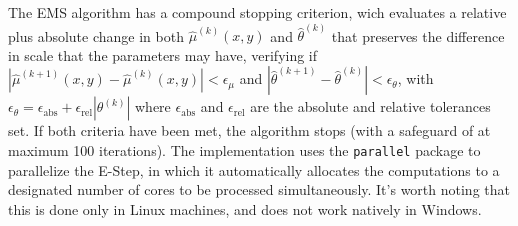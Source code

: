 The EMS algorithm has a compound stopping criterion, wich evaluates a relative plus absolute change in both $\hat{\mu}^{(k)}(x,y)$ and $\hat{\theta}^{(k)}$ that preserves the difference in scale that the parameters may have, verifying if $|\hat{\mu}^{(k+1)}(x,y) - \hat{\mu}^{(k)}(x,y)| < \epsilon_{\mu}$ and $|\hat{\theta}^{(k+1)} - \hat{\theta}^{(k)}| < \epsilon_{\theta}$, with $\epsilon_{\theta} = \epsilon_{\mathrm{abs}} + \epsilon_{\mathrm{rel}}|\theta^{(k)}|$ where $\epsilon_{\mathrm{abs}}$ and $\epsilon_{\mathrm{rel}}$ are the absolute and relative tolerances set. If both criteria have been met, the algorithm stops (with a safeguard of at maximum 100 iterations). The implementation uses the \texttt{parallel} package to parallelize the E-Step, in which it automatically allocates the computations to a designated number of cores to be processed simultaneously. It's worth noting that this is done only in Linux machines, and does not work natively in Windows.


